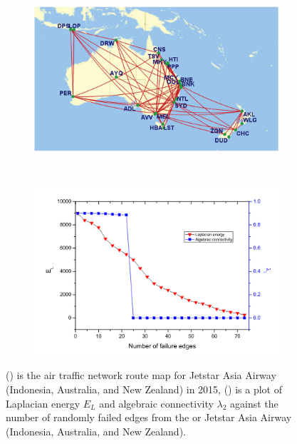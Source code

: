 \documentclass[10pt,a4paper]{article}
\begin{document}
\begin{figure}[!h]
	\centering
	\begin{subfigure}[b]{0.45\textwidth}
		\includegraphics[width=\textwidth]{images/jetstar-airnetwork.png}
		\caption{}
		\label{jetstarnetwork}
	\end{subfigure}~
	\begin{subfigure}[b]{0.45\textwidth}
		\includegraphics[width= \textwidth]{images/lapalgebraic.png}
		\caption{}
		\label{connectivitycurve}
	\end{subfigure}
	\caption{() is the air traffic network route map for Jetstar Asia Airway (Indonesia, Australia, and New Zealand) in 2015,  () is a plot of Laplacian energy $E_L$ and algebraic connectivity $\lambda_2$ against the number of randomly failed edges from the or Jetstar Asia Airway (Indonesia, Australia, and New Zealand). }
	\label{robustness}
\end{figure}
\end{document}
